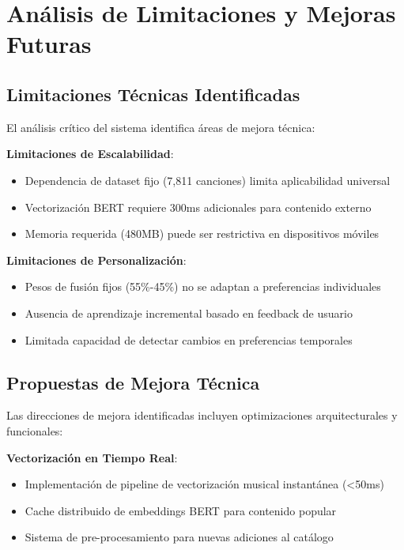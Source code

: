 \documentclass[12pt,a4paper]{report}
\begin{document}
\section{Análisis de Limitaciones y Mejoras Futuras}

\subsection{Limitaciones Técnicas Identificadas}

El análisis crítico del sistema identifica áreas de mejora técnica:

\textbf{Limitaciones de Escalabilidad}:
\begin{itemize}
\item Dependencia de dataset fijo (7,811 canciones) limita aplicabilidad universal
\item Vectorización BERT requiere 300ms adicionales para contenido externo
\item Memoria requerida (480MB) puede ser restrictiva en dispositivos móviles
\end{itemize}

\textbf{Limitaciones de Personalización}:
\begin{itemize}
\item Pesos de fusión fijos (55\%-45\%) no se adaptan a preferencias individuales
\item Ausencia de aprendizaje incremental basado en feedback de usuario
\item Limitada capacidad de detectar cambios en preferencias temporales
\end{itemize}

\subsection{Propuestas de Mejora Técnica}

Las direcciones de mejora identificadas incluyen optimizaciones arquitecturales y funcionales:

\textbf{Vectorización en Tiempo Real}:
\begin{itemize}
\item Implementación de pipeline de vectorización musical instantánea (<50ms)
\item Cache distribuido de embeddings BERT para contenido popular
\item Sistema de pre-procesamiento para nuevas adiciones al catálogo
\end{itemize}
\end{document}
